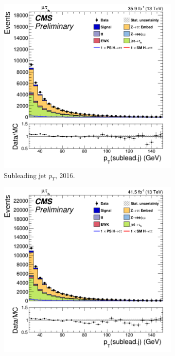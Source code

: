 \begin{figure}
    \begin{subfigure}[b]{0.33\linewidth}
    \centering
    \includegraphics[width=\linewidth]{Chapitre7/Images/CtrlPlots/2016/SubleadingJetpT.png} 
    \caption{Subleading jet $p_T$, 2016.} 
    \vspace{0.5ex}
  \end{subfigure}%
  \begin{subfigure}[b]{0.33\linewidth}
    \centering
    \includegraphics[width=\linewidth]{Chapitre7/Images/CtrlPlots/2017/SubleadingJetpT.png} 

\end{subfigure}
\end{figure}
